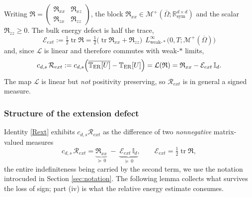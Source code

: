 \documentclass[12pt,a4paper,twoside]{article}
\newcommand{\Ov}[1]{\overline{#1}}
\numberwithin{equation}{section}%
\begin{document}
Writing $\mathfrak R = \left(\begin{smallmatrix}\mathfrak R_{xx} & \mathfrak R_{xz}\\ \mathfrak R_{zx} & \mathfrak R_{zz}\end{smallmatrix}\right)$, the block $\mathfrak R_{xx}\in\mathcal M^+(\overline\Omega;\mathbb R^{d\times d}_{\mathrm{sym}})$ and the scalar $\mathfrak R_{zz}\ge0$. The bulk energy defect is half the trace,
\begin{equation}\label{Eext}
	\mathcal E_{ext} := \tfrac12 \operatorname{tr}\mathfrak R = \tfrac12\big( \operatorname{tr}\mathfrak R_{xx} + \mathfrak R_{zz} \big) \ \ L^\infty_{\mathrm{weak}\text{-}*}\big(0,T;\mathcal M^+(\Ov{\Omega} )\big)
\end{equation}
and, since $\mathcal L$ is linear and therefore commutes with weak-$*$ limits,
\begin{equation}\label{Rext}
	c_{d,s}\,\mathcal R_{ext} := c_{d,s}\Big( \Ov{\mathbb T_{\rm ER}[U]} - \mathbb T_{\rm ER}[U] \Big) = \mathcal L(\mathfrak R) = \mathfrak R_{xx} - \mathcal E_{ext}\,\mathbb I_d .
\end{equation}
The map $\mathcal L$ is linear but \emph{not} positivity preserving, so $\mathcal R_{ext}$ is in general a signed measure. 

\subsubsection*{Structure of the extension defect}
\label{sec:stability-defect-ext}

Identity \eqref{Rext} exhibits $c_{d,s}\mathcal R_{ext}$ as the difference of two \emph{nonnegative} matrix-valued measures
\begin{equation}\label{Rext-str}
	c_{d,s}\,\mathcal R_{ext} = \underbrace{\mathfrak R_{xx}}_{\succeq\,0} \;-\; \underbrace{\mathcal E_{ext}\,\mathbb I_d}_{\succeq\,0},
	\qquad
	\mathcal E_{ext} = \tfrac12\operatorname{tr}\mathfrak R ,
\end{equation}
the entire indefiniteness being carried by the second term, we use the notation introcuded in Section \ref{sec:notation}. The following lemma collects what survives the loss of sign; part (iv) is what the relative energy estimate consumes.
\end{document}
